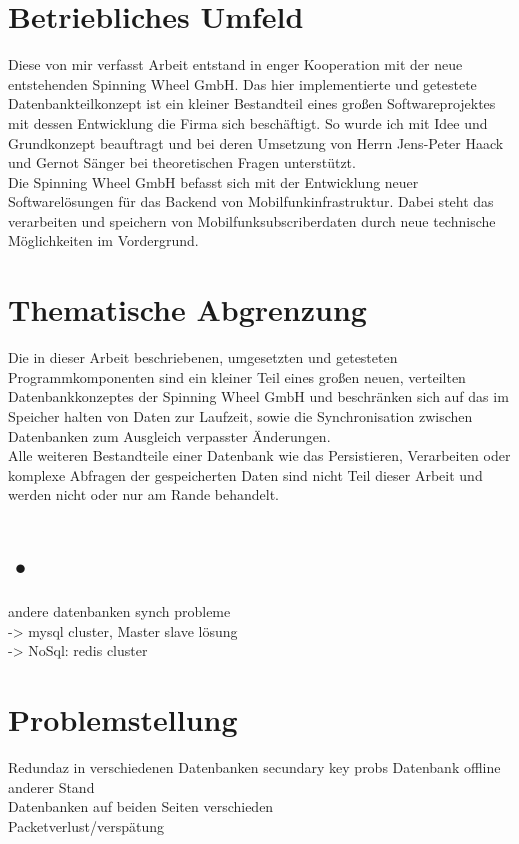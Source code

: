 \documentclass[a4paper,11pt,oneside,%
headsepline,												%
footsepline,												%
bibtotocnumbered									%
]{scrreprt}
\begin{document}
\section{Betriebliches Umfeld}
Diese von mir verfasst Arbeit entstand in enger Kooperation mit der neue entstehenden Spinning Wheel GmbH. Das hier implementierte und getestete Datenbankteilkonzept ist ein kleiner Bestandteil eines großen Softwareprojektes mit dessen Entwicklung die Firma sich beschäftigt. So wurde ich mit Idee und Grundkonzept beauftragt und bei deren Umsetzung von Herrn Jens-Peter Haack und Gernot Sänger bei theoretischen Fragen unterstützt.\\

Die Spinning Wheel GmbH befasst sich mit der Entwicklung neuer Softwarelösungen für das Backend von Mobilfunkinfrastruktur. Dabei steht das verarbeiten und speichern von Mobilfunksubscriberdaten durch neue technische Möglichkeiten im Vordergrund.

\section{Thematische Abgrenzung}
Die in dieser Arbeit beschriebenen, umgesetzten und getesteten Programmkomponenten sind ein kleiner Teil eines großen neuen, verteilten Datenbankkonzeptes der Spinning Wheel GmbH und beschränken sich auf das im Speicher halten von Daten zur Laufzeit, sowie die Synchronisation zwischen Datenbanken zum Ausgleich verpasster Änderungen.\\

Alle weiteren Bestandteile einer Datenbank wie das Persistieren, Verarbeiten oder komplexe Abfragen der gespeicherten Daten sind nicht Teil dieser Arbeit und werden nicht oder nur am Rande behandelt.  

\section{•}
andere datenbanken synch probleme\\
-> mysql cluster, Master slave lösung\\
-> NoSql: redis cluster\\



\section{Problemstellung}
Redundaz in verschiedenen Datenbanken
secundary key probs
Datenbank offline anderer Stand \\
Datenbanken auf beiden Seiten verschieden\\
Packetverlust/verspätung
\end{document}
